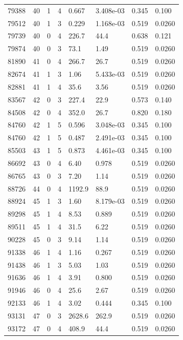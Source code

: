 \documentclass[preview]{standalone}
\begin{document}
{{{{{\begin{tabular}{L{1.2cm}C{1.2cm} C{0.3cm}C{0.5cm} C{1.4cm}C{1.4cm} C{1.4cm}C{1.4cm}}
  79388  &    40  & 1     &  4 &  0.667  & 3.408e-03  & 0.345 &  0.100   \\ 
  79512  &    40  & 1     &  3 &  0.229  & 1.168e-03  & 0.519 &  0.0260   \\ 
  79739  &    40  & 0     &  4 &  226.7  & 44.4  & 0.638 &  0.121   \\ 
  79874  &    40  & 0     &  3 &  73.1  & 1.49  & 0.519 &  0.0260   \\ 
  81890  &    41  & 0     &  4 &  266.7  & 26.7  & 0.519 &  0.0260   \\ 
  82674  &    41  & 1     &  3 &  1.06  & 5.433e-03  & 0.519 &  0.0260   \\ 
  82881  &    41  & 1     &  4 &  35.6  & 3.56  & 0.519 &  0.0260   \\ 
  83567  &    42  & 0     &  3 &  227.4  & 22.9  & 0.573 &  0.140   \\ 
  84508  &    42  & 0     &  4 &  352.0  & 26.7  & 0.820 &  0.180   \\ 
  84760  &    42  & 1     &  5 &  0.596  & 3.048e-03  & 0.345 &  0.100   \\ 
  84760  &    42  & 1     &  5 &  0.487  & 2.491e-03  & 0.345 &  0.100   \\ 
  85503  &    43  & 1     &  5 &  0.873  & 4.461e-03  & 0.345 &  0.100   \\ 
  86692  &    43  & 0     &  4 &  6.40  & 0.978  & 0.519 &  0.0260   \\ 
  86765  &    43  & 0     &  3 &  7.20  & 1.14  & 0.519 &  0.0260   \\ 
  88726  &    44  & 0     &  4 &  1192.9  & 88.9  & 0.519 &  0.0260   \\ 
  88924  &    45  & 1     &  3 &  1.60  & 8.179e-03  & 0.519 &  0.0260   \\ 
  89298  &    45  & 1     &  4 &  8.53  & 0.889  & 0.519 &  0.0260   \\ 
  89511  &    45  & 1     &  4 &  31.5  & 6.22  & 0.519 &  0.0260   \\ 
  90228  &    45  & 0     &  3 &  9.14  & 1.14  & 0.519 &  0.0260   \\ 
  91338  &    46  & 1     &  4 &  1.16  & 0.267  & 0.519 &  0.0260   \\ 
  91438  &    46  & 1     &  3 &  5.03  & 1.03  & 0.519 &  0.0260   \\ 
  91636  &    46  & 1     &  4 &  3.91  & 0.800  & 0.519 &  0.0260   \\ 
  91946  &    46  & 0     &  4 &  25.6  & 2.67  & 0.519 &  0.0260   \\ 
  92133  &    46  & 1     &  4 &  3.02  & 0.444  & 0.345 &  0.100   \\ 
  93131  &    47  & 0     &  3 &  2628.6  & 262.9  & 0.519 &  0.0260   \\ 
  93172  &    47  & 0     &  4 &  408.9  & 44.4  & 0.519 &  0.0260   \\ 
\hline 
\end{tabular} 

}}}}}
\end{document}
